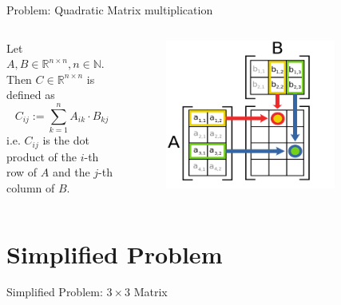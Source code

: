 \documentclass[compress,aspectratio=169]{beamer}
\begin{document}
\begin{frame}{Problem: Quadratic Matrix multiplication}
  \begin{columns}
    \begin{column}{0.5\textwidth}
      Let $A, B \in \mathbb{R}^{n\times n}, n \in \mathbb{N}$. Then $C \in \mathbb{R}^{n \times n}$ is defined as
      \[
        C_{ij} := \sum_{k=1}^n A_{ik} \cdot B_{kj}
      \]
      i.e. $C_{ij}$ is the dot product of the $i$-th row of $A$ and the $j$-th column of $B$.
    \end{column}
    \begin{column}{0.5\textwidth}
      \begin{figure}
        \includegraphics[width=0.8\textwidth]{../assets/Matrix_multiplication_diagram_2.svg.png} \cite{matmulvis}
      \end{figure}
    \end{column}
  \end{columns}
\end{frame}

\section{Simplified Problem}

\begin{frame}[fragile]{Simplified Problem: $3 \times 3$ Matrix}
  \begin{tcolorbox}[title=First Implementation]
    \footnotesize\inputminted[xleftmargin=1em,linenos]{rust}{./assets/first_impl.rs}
  \end{tcolorbox}
\end{frame}
\end{document}
